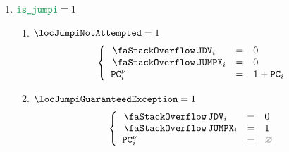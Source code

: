 \begin{description}
\begin{enumerate}
\begin{enumerate}
					\item \If $\locJumpGuaranteedException = 1$ \Then
						\[
							\left\{ \begin{array}{lcl}
								\stackJumpDestinationVetting_{i} & = & 0        \\
								\stackJumpx_{i}                  & = & 1        \\
								\pc\new_{i}                      & = & \nothing \\
							\end{array} \right.
						\]
					\item \If $\locJumpMustBeAttempted = 1$ \Then
						\[
							\left\{ \begin{array}{lcl}
								\stackJumpDestinationVetting_{i} & = & \rOne          \\
								\stackJumpx_{i}                  & = & \relevantValue \\
								\multicolumn{3}{l}{\If \xAhoy_{i} = 0 ~ \Then \pc\new_{i} = \locNewPcLo} \\
							\end{array} \right.
						\]
						The above implicitly justifies $\stackJumpx_{i}$ through the ``jump destination vetting'' lookup to the  \romMod{} module, see section~(\ref{hub: lookups: into rom: jump destination vetting}).
				\end{enumerate}
			\item \If $\locIsJumpi = 1$ \Then 
				\begin{enumerate}
					\item \If $\locJumpiNotAttempted = 1$ \Then
						\[
							\left\{ \begin{array}{lcl}
								\stackJumpDestinationVetting_{i} & = & 0           \\
								\stackJumpx_{i}                  & = & 0           \\
								\pc\new_{i}                      & = & 1 + \pc_{i} \\
							\end{array} \right.
						\]
					\item \If $\locJumpiGuaranteedException = 1$ \Then
						\[
							\left\{ \begin{array}{lcl}
								\stackJumpDestinationVetting_{i} & = & 0        \\
								\stackJumpx_{i}                  & = & 1        \\
								\pc\new_{i}                      & = & \nothing \\
							\end{array} \right.
\]
\end{enumerate}
\end{enumerate}
\end{description}
